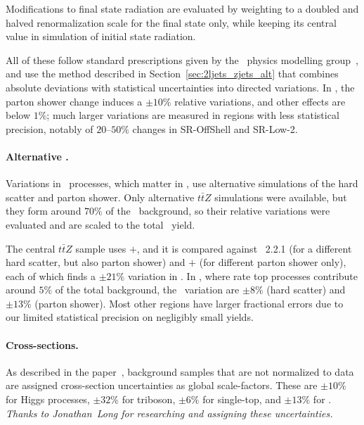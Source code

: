 Modifications to final state radiation are evaluated by weighting to a doubled
and halved renormalization scale for the final state only, while keeping
its central value in simulation of initial state radiation.

All of these follow standard prescriptions given by the \atlas\ physics
modelling group~\cite{atlas_twiki_top}, and use the method described in
Section~\ref{sec:2ljets_zjets_alt} that combines absolute deviations with
statistical uncertainties into directed variations.
In \crtt, the parton shower change induces a $\pm10\%$ relative variations,
and other effects are below $1\%$; much larger variations are measured in
regions with less statistical precision, notably of $20\textrm{--}50\%$ changes
in SR-OffShell and SR-Low-2.

\paragraph{Alternative \topother.}
Variations in \topother\ processes, which matter in \srllbb, use
alternative simulations of the hard scatter and parton shower.
Only alternative $t\bar{t}Z$ simulations were available, but they form around
$70\%$ of the \topother\ background, so their relative variations were evaluated
and are scaled to the total \topother\ yield.

The central $t\bar{t}Z$ sample uses \amcatnlo$+$, and it is compared
against \pythia~2.2.1 (for a different hard scatter, but also parton shower)
and \amcatnlo$+$ (for different parton shower only), each of which
finds a $\pm21\%$ variation in \srllbb.
In \crtt,
where rate top processes contribute around $5\%$ of the total background,
the \topother\ variation are
$\pm8\%$ (hard scatter) and
$\pm13\%$ (parton shower).
Most other regions have larger fractional errors due to our limited
statistical precision on negligibly small yields.

\paragraph{Cross-sections.}
As described in the paper~\cite{atlas2022searches},
background samples that are not normalized to data are assigned cross-section
uncertainties as global scale-factors.
These are $\pm10\%$ for Higgs processes,
$\pm32\%$ for triboson,
$\pm6\%$ for single-top,
and $\pm13\%$ for \topother.
\emph{Thanks to Jonathan~Long for researching and assigning these uncertainties.}

